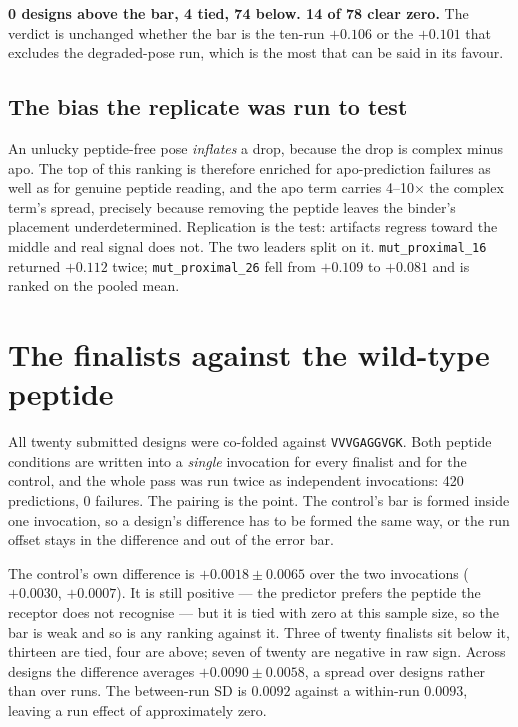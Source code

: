 \documentclass[11pt,a4paper]{article}
\begin{document}
\noindent\textbf{0 designs above the bar, 4 tied, 74 below. 14 of 78 clear zero.} The verdict is
unchanged whether the bar is the ten-run $+0.106$ or the $+0.101$ that excludes the degraded-pose
run, which is the most that can be said in its favour.

\subsection{The bias the replicate was run to test}

An unlucky peptide-free pose \emph{inflates} a drop, because the drop is complex minus apo. The
top of this ranking is therefore enriched for apo-prediction failures as well as for genuine
peptide reading, and the apo term carries 4--10$\times$ the complex term's spread, precisely
because removing the peptide leaves the binder's placement underdetermined. Replication is the
test: artifacts regress toward the middle and real signal does not. The two leaders split on it.
\texttt{mut\_proximal\_16} returned $+0.112$ twice; \texttt{mut\_proximal\_26} fell from $+0.109$
to $+0.081$ and is ranked on the pooled mean.

\section{The finalists against the wild-type peptide}

All twenty submitted designs were co-folded against \texttt{VVVGAGGVGK}. Both peptide conditions
are written into a \emph{single} invocation for every finalist and for the control, and the whole
pass was run twice as independent invocations: 420 predictions, 0 failures. The pairing is the
point. The control's bar is formed inside one invocation, so a design's difference has to be
formed the same way, or the run offset stays in the difference and out of the error bar.

The control's own difference is $+0.0018 \pm 0.0065$ over the two invocations ($+0.0030$,
$+0.0007$). It is still positive --- the predictor prefers the peptide the receptor does not
recognise --- but it is tied with zero at this sample size, so the bar is weak and so is any
ranking against it. Three of twenty finalists sit below it, thirteen are tied, four are above;
seven of twenty are negative in raw sign. Across designs the difference averages
$+0.0090 \pm 0.0058$, a spread over designs rather than over runs. The between-run SD is $0.0092$
against a within-run $0.0093$, leaving a run effect of approximately zero.
\end{document}
